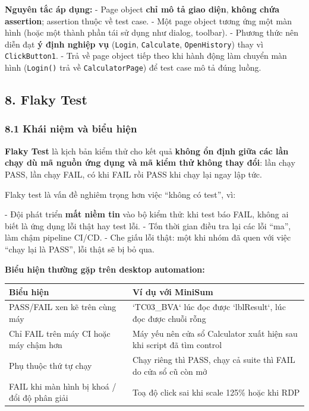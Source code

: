 \textbf{Nguyên tắc áp dụng:}
- Page object \textbf{chỉ mô tả giao diện}, \textbf{không chứa assertion}; assertion thuộc về test case.
- Một page object tương ứng một màn hình (hoặc một thành phần tái sử dụng như dialog, toolbar).
- Phương thức nên diễn đạt \textbf{ý định nghiệp vụ} (\texttt{Login}, \texttt{Calculate}, \texttt{OpenHistory}) thay vì \texttt{ClickButton1}.
- Trả về page object tiếp theo khi hành động làm chuyển màn hình (\texttt{Login()} trả về \texttt{CalculatorPage}) để test case mô tả đúng luồng.


\subsection{8. Flaky Test}

\subsubsection{8.1 Khái niệm và biểu hiện}

\textbf{Flaky Test} là kịch bản kiểm thử cho kết quả \textbf{không ổn định giữa các lần chạy dù mã nguồn ứng dụng và mã kiểm thử không thay đổi}: lần chạy PASS, lần chạy FAIL, có khi FAIL rồi PASS khi chạy lại ngay lập tức.

Flaky test là vấn đề nghiêm trọng hơn việc “không có test”, vì:

- Đội phát triển \textbf{mất niềm tin} vào bộ kiểm thử: khi test báo FAIL, không ai biết là ứng dụng lỗi thật hay test lỗi.
- Tốn thời gian điều tra lại các lỗi “ma”, làm chậm pipeline CI/CD.
- Che giấu lỗi thật: một khi nhóm đã quen với việc “chạy lại là PASS”, lỗi thật sẽ bị bỏ qua.

\textbf{Biểu hiện thường gặp trên desktop automation:}

\begin{table}[H]
\centering
\begin{tabular}{|l|l|}
\hline
\textbf{Biểu hiện} & \textbf{Ví dụ với MiniSum} \\ \hline
PASS/FAIL xen kẽ trên cùng máy & `TC03\_BVA` lúc đọc được `lblResult`, lúc đọc được chuỗi rỗng \\ \hline
Chỉ FAIL trên máy CI hoặc máy chậm hơn & Máy yếu nên cửa sổ Calculator xuất hiện sau khi script đã tìm control \\ \hline
Phụ thuộc thứ tự chạy & Chạy riêng thì PASS, chạy cả suite thì FAIL do cửa sổ cũ còn mở \\ \hline
FAIL khi màn hình bị khoá / đổi độ phân giải & Toạ độ click sai khi scale 125\% hoặc khi RDP \\ \hline
\end{tabular}
\end{table}




